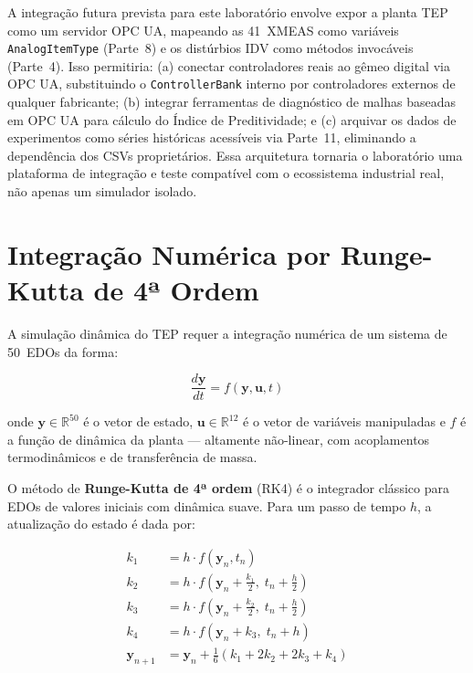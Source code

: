 A integração futura prevista para este laboratório envolve expor a planta TEP como um servidor OPC UA, mapeando as 41~XMEAS como variáveis \texttt{AnalogItemType} (Parte~8) e os distúrbios IDV como métodos invocáveis (Parte~4). Isso permitiria: (a) conectar controladores reais ao gêmeo digital via OPC UA, substituindo o \texttt{ControllerBank} interno por controladores externos de qualquer fabricante; (b) integrar ferramentas de diagnóstico de malhas baseadas em OPC UA para cálculo do Índice de Preditividade; e (c) arquivar os dados de experimentos como séries históricas acessíveis via Parte~11, eliminando a dependência dos CSVs proprietários. Essa arquitetura tornaria o laboratório uma plataforma de integração e teste compatível com o ecossistema industrial real, não apenas um simulador isolado.

\section{Integração Numérica por Runge-Kutta de 4ª Ordem}
\label{sec:rk4}

A simulação dinâmica do TEP requer a integração numérica de um sistema de 50~EDOs da forma:

\begin{equation}
  \frac{d\mathbf{y}}{dt} = f(\mathbf{y}, \mathbf{u}, t)
  \label{eq:ode}
\end{equation}

\noindent onde $\mathbf{y} \in \mathbb{R}^{50}$ é o vetor de estado, $\mathbf{u} \in \mathbb{R}^{12}$ é o vetor de variáveis manipuladas e $f$ é a função de dinâmica da planta — altamente não-linear, com acoplamentos termodinâmicos e de transferência de massa.

O método de \textbf{Runge-Kutta de 4ª ordem} (RK4) é o integrador clássico para EDOs de valores iniciais com dinâmica suave. Para um passo de tempo $h$, a atualização do estado é dada por:

\begin{align}
  k_1 &= h \cdot f(\mathbf{y}_n, t_n) \nonumber \\
  k_2 &= h \cdot f\!\left(\mathbf{y}_n + \tfrac{k_1}{2},\; t_n + \tfrac{h}{2}\right) \nonumber \\
  k_3 &= h \cdot f\!\left(\mathbf{y}_n + \tfrac{k_2}{2},\; t_n + \tfrac{h}{2}\right) \nonumber \\
  k_4 &= h \cdot f(\mathbf{y}_n + k_3,\; t_n + h) \nonumber \\
  \mathbf{y}_{n+1} &= \mathbf{y}_n + \tfrac{1}{6}(k_1 + 2k_2 + 2k_3 + k_4)
  \label{eq:rk4}
\end{align}

